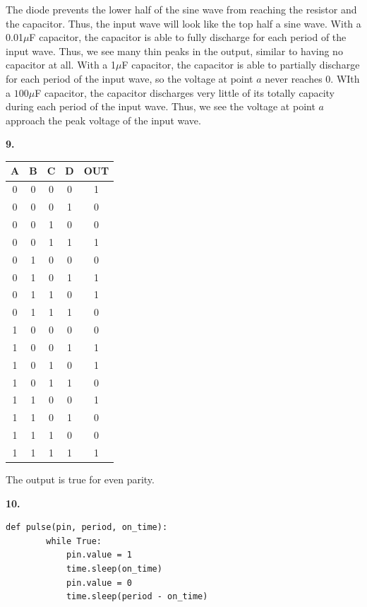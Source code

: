 \documentclass{article}
\begin{document}
    The diode prevents the lower half of the sine wave from reaching the resistor and the capacitor. Thus, the input wave will look like the top half a sine wave.
    With a 0.01$\mu$F capacitor, the capacitor is able to fully discharge for each period of the input wave. Thus, we see many thin peaks in the output, similar to having no capacitor at all.
    With a 1$\mu$F capacitor, the capacitor is able to partially discharge for each period of the input wave, so the voltage at point $a$ never reaches 0.
    WIth a $100\mu$F capacitor, the capacitor discharges very little of its totally capacity during each period of the input wave. Thus, we see the voltage at point $a$ approach the peak voltage of the input wave.

\newpage\noindent\textbf{9.}

    \begin{tabular}{| c | c | c | c | c |}
        \hline
        A & B & C & D & OUT \\
        \hline
        0 & 0 & 0 & 0 & 1 \\
        0 & 0 & 0 & 1 & 0 \\
        0 & 0 & 1 & 0 & 0 \\
        0 & 0 & 1 & 1 & 1 \\
        0 & 1 & 0 & 0 & 0 \\
        0 & 1 & 0 & 1 & 1 \\
        0 & 1 & 1 & 0 & 1 \\
        0 & 1 & 1 & 1 & 0 \\
        1 & 0 & 0 & 0 & 0 \\
        1 & 0 & 0 & 1 & 1 \\
        1 & 0 & 1 & 0 & 1 \\
        1 & 0 & 1 & 1 & 0 \\
        1 & 1 & 0 & 0 & 1 \\
        1 & 1 & 0 & 1 & 0 \\
        1 & 1 & 1 & 0 & 0 \\
        1 & 1 & 1 & 1 & 1 \\
        \hline
    \end{tabular}

    \medskip The output is true for even parity.

\newpage\noindent\textbf{10.}

	\begin{verbatim}def pulse(pin, period, on_time):
	    while True:
	        pin.value = 1
	        time.sleep(on_time)
	        pin.value = 0
	        time.sleep(period - on_time)
	\end{verbatim}
\end{document}
